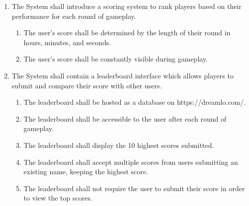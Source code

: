 \documentclass[12pt]{report}
\newenvironment{reqlist}{
	\renewcommand{\labelenumi}{\tab\thesubsection.\arabic{enumi}}
	\renewcommand{\labelenumii}{\thesubsection.\arabic{enumi}.\arabic{enumii}}
	\begin{enumerate}[itemsep = 1pt, parsep = 0pt, leftmargin = *]
}{\end{enumerate}}
\begin{document}
\begin{reqlist}
			\begin{reqlist}
				\item The store shall be accessible to the user after each round of gameplay.
				\item The store shall allow the user to make purchases by clicking a UI button.
				\item The store shall display the name, price, and description for each available item upon hovering over their purchase buttons.
				\item The store shall not allow the user to purchase an item already in their posession.
				\item The store purchases shall be persistent between multiple sessions.
				\item The store purchases shall be erased upon the user pressing the ``delete data" button in the settings menu.
			\end{reqlist}
			\item The System shall introduce a scoring system to rank players based on their performance for each round of gameplay.
			\begin{reqlist}
				\item The user's score shall be determined by the length of their round in hours, minutes, and seconds.
				\item The user's score shall be constantly visible during gameplay.
			\end{reqlist}
			\item The System shall contain a leaderboard interface which allows players to submit and compare their score with other users.
			\begin{reqlist}
				\item The leaderboard shall be hosted as a database on https://dreamlo.com/.
				\item The leaderboard shall be accessible to the user after each round of gameplay.
				\item The leaderboard shall display the 10 highest scores submitted.
				\item The leaderboard shall accept multiple scores from users submitting an existing name, keeping the highest score.
				\item The leaderboard shall not require the user to submit their score in order to view the top scores.
			\end{reqlist}
		\end{reqlist}
\end{document}
